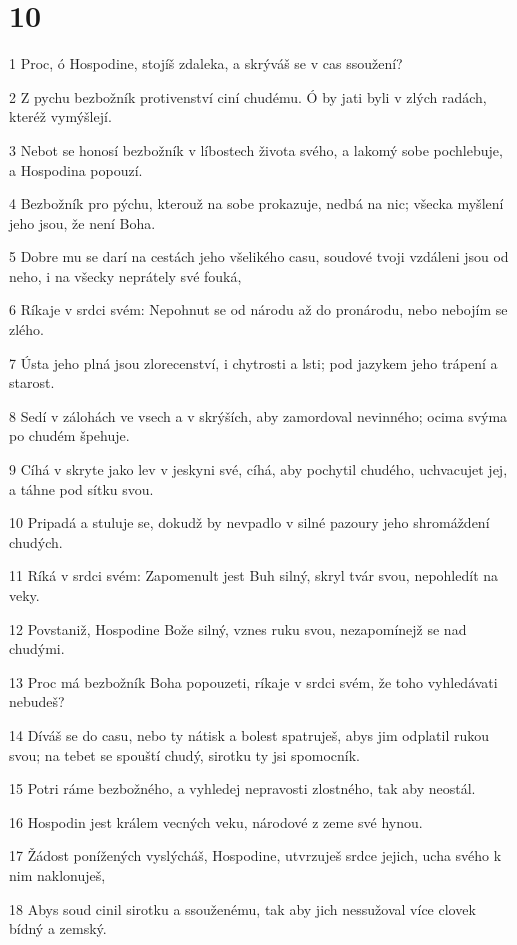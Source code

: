 \chapter{10}

\par 1 Proc, ó Hospodine, stojíš zdaleka, a skrýváš se v cas ssoužení?
\par 2 Z pychu bezbožník protivenství ciní chudému. Ó by jati byli v zlých radách, kteréž vymýšlejí.
\par 3 Nebot se honosí bezbožník v líbostech života svého, a lakomý sobe pochlebuje, a Hospodina popouzí.
\par 4 Bezbožník pro pýchu, kterouž na sobe prokazuje, nedbá na nic; všecka myšlení jeho jsou, že není Boha.
\par 5 Dobre mu se darí na cestách jeho všelikého casu, soudové tvoji vzdáleni jsou od neho, i na všecky neprátely své fouká,
\par 6 Ríkaje v srdci svém: Nepohnut se od národu až do pronárodu, nebo nebojím se zlého.
\par 7 Ústa jeho plná jsou zlorecenství, i chytrosti a lsti; pod jazykem jeho trápení a starost.
\par 8 Sedí v zálohách ve vsech a v skrýších, aby zamordoval nevinného; ocima svýma po chudém špehuje.
\par 9 Cíhá v skryte jako lev v jeskyni své, cíhá, aby pochytil chudého, uchvacujet jej, a táhne pod sítku svou.
\par 10 Pripadá a stuluje se, dokudž by nevpadlo v silné pazoury jeho shromáždení chudých.
\par 11 Ríká v srdci svém: Zapomenult jest Buh silný, skryl tvár svou, nepohledít na veky.
\par 12 Povstaniž, Hospodine Bože silný, vznes ruku svou, nezapomínejž se nad chudými.
\par 13 Proc má bezbožník Boha popouzeti, ríkaje v srdci svém, že toho vyhledávati nebudeš?
\par 14 Díváš se do casu, nebo ty nátisk a bolest spatruješ, abys jim odplatil rukou svou; na tebet se spouští chudý, sirotku ty jsi spomocník.
\par 15 Potri ráme bezbožného, a vyhledej nepravosti zlostného, tak aby neostál.
\par 16 Hospodin jest králem vecných veku, národové z zeme své hynou.
\par 17 Žádost ponížených vyslýcháš, Hospodine, utvrzuješ srdce jejich, ucha svého k nim naklonuješ,
\par 18 Abys soud cinil sirotku a ssouženému, tak aby jich nessužoval více clovek bídný a zemský.

